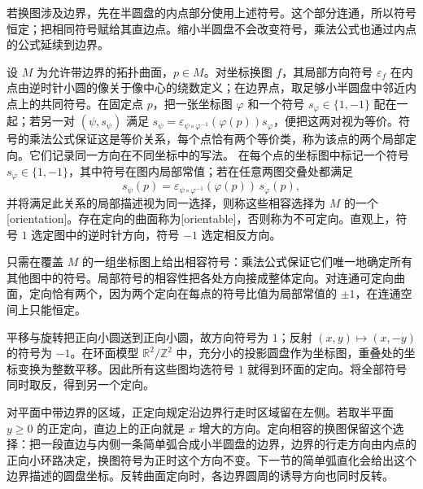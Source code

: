 若换图涉及边界，先在半圆盘的内点部分使用上述符号。这个部分连通，所以符号恒定；把相同符号赋给其直边点。缩小半圆盘不会改变符号，乘法公式也通过内点的公式延续到边界。

\begin{definition}\label{g1:def:surface-orientation}
	设 \(M\) 为允许带边界的拓扑曲面，\(p\in M\)。对坐标换图 \(f\)，其局部方向符号 \(\varepsilon_f\) 在内点由逆时针小圆的像关于像中心的绕数定义；在边界点，取足够小半圆盘中邻近内点上的共同符号。在固定点 \(p\)，把一张坐标图 \(\varphi\) 和一个符号 \(s_\varphi\in\{1,-1\}\) 配在一起；若另一对 \((\psi,s_\psi)\) 满足 \(s_\psi=\varepsilon_{\psi\circ\varphi^{-1}}(\varphi(p))s_\varphi\)，便把这两对视为等价。符号的乘法公式保证这是等价关系，每个点恰有两个等价类，称为该点的两个局部定向。它们记录同一方向在不同坐标中的写法。
	在每个点的坐标图中标记一个符号 \(s_\varphi\in\{1,-1\}\)，其中符号在图内局部常值；若在任意两图交叠处都满足
	\[
		s_\psi(p)=\varepsilon_{\psi\circ\varphi^{-1}}(\varphi(p))\,s_\varphi(p),
	\]
	并将满足此关系的局部描述视为同一选择，则称这些相容选择为 \(M\) 的一个[orientation]。存在定向的曲面称为[orientable]，否则称为不可定向。直观上，符号 \(1\) 选定图中的逆时针方向，符号 \(-1\) 选定相反方向。
\end{definition}

只需在覆盖 \(M\) 的一组坐标图上给出相容符号：乘法公式保证它们唯一地确定所有其他图中的符号。局部符号的相容性把各处方向接成整体定向。对连通可定向曲面，定向恰有两个，因为两个定向在每点的符号比值为局部常值的 \(\pm1\)，在连通空间上只能恒定。

\begin{example}\label{g1:exm:torus-local-orientation}
	平移与旋转把正向小圆送到正向小圆，故方向符号为 \(1\)；反射 \((x,y)\mapsto(x,-y)\) 的符号为 \(-1\)。在环面模型 \(\mathbb R^2/\mathbb Z^2\) 中，充分小的投影圆盘作为坐标图，重叠处的坐标变换为整数平移。因此所有这些图均选符号 \(1\) 就得到环面的定向。将全部符号同时取反，得到另一个定向。
\end{example}

对平面中带边界的区域，正定向规定沿边界行走时区域留在左侧。若取半平面 \(y\ge0\) 的正定向，直边上的正向就是 \(x\) 增大的方向。定向相容的换图保留这个选择：把一段直边与内侧一条简单弧合成小半圆盘的边界，边界的行走方向由内点的正向小环路决定，换图符号为正时这个方向不变。下一节的简单弧直化会给出这个边界描述的圆盘坐标。反转曲面定向时，各边界圆周的诱导方向也同时反转。
